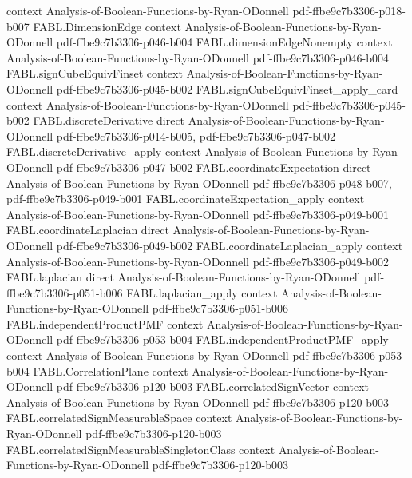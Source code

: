 \begin{theorem}
  {context}
  {Analysis-of-Boolean-Functions-by-Ryan-ODonnell}
  {pdf-ffbe9c7b3306-p018-b007}
\proofstep
  {FABL.DimensionEdge}
  {context}
  {Analysis-of-Boolean-Functions-by-Ryan-ODonnell}
  {pdf-ffbe9c7b3306-p046-b004}
\proofstep
  {FABL.dimensionEdgeNonempty}
  {context}
  {Analysis-of-Boolean-Functions-by-Ryan-ODonnell}
  {pdf-ffbe9c7b3306-p046-b004}
\proofstep
  {FABL.signCubeEquivFinset}
  {context}
  {Analysis-of-Boolean-Functions-by-Ryan-ODonnell}
  {pdf-ffbe9c7b3306-p045-b002}
\proofstep
  {FABL.signCubeEquivFinset_apply_card}
  {context}
  {Analysis-of-Boolean-Functions-by-Ryan-ODonnell}
  {pdf-ffbe9c7b3306-p045-b002}
\proofstep
  {FABL.discreteDerivative}
  {direct}
  {Analysis-of-Boolean-Functions-by-Ryan-ODonnell}
  {pdf-ffbe9c7b3306-p014-b005,
    pdf-ffbe9c7b3306-p047-b002}
\proofstep
  {FABL.discreteDerivative_apply}
  {context}
  {Analysis-of-Boolean-Functions-by-Ryan-ODonnell}
  {pdf-ffbe9c7b3306-p047-b002}
\proofstep
  {FABL.coordinateExpectation}
  {direct}
  {Analysis-of-Boolean-Functions-by-Ryan-ODonnell}
  {pdf-ffbe9c7b3306-p048-b007,
    pdf-ffbe9c7b3306-p049-b001}
\proofstep
  {FABL.coordinateExpectation_apply}
  {context}
  {Analysis-of-Boolean-Functions-by-Ryan-ODonnell}
  {pdf-ffbe9c7b3306-p049-b001}
\proofstep
  {FABL.coordinateLaplacian}
  {direct}
  {Analysis-of-Boolean-Functions-by-Ryan-ODonnell}
  {pdf-ffbe9c7b3306-p049-b002}
\proofstep
  {FABL.coordinateLaplacian_apply}
  {context}
  {Analysis-of-Boolean-Functions-by-Ryan-ODonnell}
  {pdf-ffbe9c7b3306-p049-b002}
\proofstep
  {FABL.laplacian}
  {direct}
  {Analysis-of-Boolean-Functions-by-Ryan-ODonnell}
  {pdf-ffbe9c7b3306-p051-b006}
\proofstep
  {FABL.laplacian_apply}
  {context}
  {Analysis-of-Boolean-Functions-by-Ryan-ODonnell}
  {pdf-ffbe9c7b3306-p051-b006}
\proofstep
  {FABL.independentProductPMF}
  {context}
  {Analysis-of-Boolean-Functions-by-Ryan-ODonnell}
  {pdf-ffbe9c7b3306-p053-b004}
\proofstep
  {FABL.independentProductPMF_apply}
  {context}
  {Analysis-of-Boolean-Functions-by-Ryan-ODonnell}
  {pdf-ffbe9c7b3306-p053-b004}
\proofstep
  {FABL.CorrelationPlane}
  {context}
  {Analysis-of-Boolean-Functions-by-Ryan-ODonnell}
  {pdf-ffbe9c7b3306-p120-b003}
\proofstep
  {FABL.correlatedSignVector}
  {context}
  {Analysis-of-Boolean-Functions-by-Ryan-ODonnell}
  {pdf-ffbe9c7b3306-p120-b003}
\proofstep
  {FABL.correlatedSignMeasurableSpace}
  {context}
  {Analysis-of-Boolean-Functions-by-Ryan-ODonnell}
  {pdf-ffbe9c7b3306-p120-b003}
\proofstep
  {FABL.correlatedSignMeasurableSingletonClass}
  {context}
  {Analysis-of-Boolean-Functions-by-Ryan-ODonnell}
  {pdf-ffbe9c7b3306-p120-b003}

\end{theorem}
